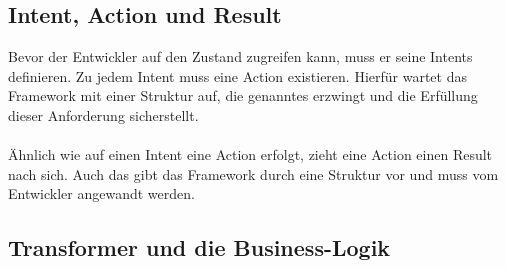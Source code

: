 \subsection{Intent, Action und Result}
Bevor der Entwickler auf den Zustand zugreifen kann, muss er seine Intents definieren. Zu jedem Intent muss eine Action existieren. Hierfür wartet das Framework mit einer Struktur auf, die genanntes erzwingt und die Erfüllung dieser Anforderung sicherstellt. 
\\
\\
Ähnlich wie auf einen Intent eine Action erfolgt, zieht eine Action einen Result nach sich. Auch das gibt das Framework durch eine Struktur vor und muss vom Entwickler angewandt werden.

\subsection{Transformer und die Business-Logik}

